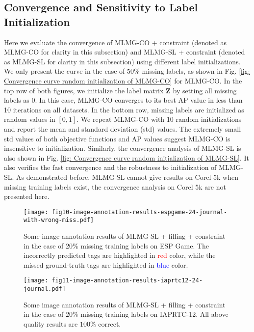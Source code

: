 \documentclass[twocolumn]{svjour3}          %
\def\red#1{\textcolor{red}{#1}}
\def\blue#1{\textcolor{blue}{#1}}
\begin{document}
\subsection{Convergence and Sensitivity to Label Initialization} 
\label{sec: 5 subsec convergence curve}
Here we evaluate the convergence of MLMG-CO + constraint (denoted as MLMG-CO for clarity in this subsection) and MLMG-SL + constraint (denoted as MLMG-SL for clarity in this subsection) using different label initializations. We only present the curve in the case of $50\%$ missing labels, as shown in Fig. \ref{fig: Convergence curve random initialization of MLMG-CO} for MLMG-CO. 
In the top row of both figures, we initialize the label matrix $\mathbf{Z}$ by setting all missing labels as $0$. In this case, MLMG-CO converges to its best AP value in less than 10 iterations on all datasets. 
In the bottom row, missing labels are initialized as random values in $[0,1]$. We repeat MLMG-CO with 10 random initializations and report the mean and standard deviation (std) values. The extremely small std values of both objective functions and AP values suggest MLMG-CO is insensitive to initialization.
Similarly, the convergence analysis of MLMG-SL is also shown in Fig. \ref{fig: Convergence curve random initialization of MLMG-SL}. 
It also verifies the fast convergence and the robustness to initialization of MLMG-SL. 
As demonstrated before, MLMG-SL cannot give results on Corel 5k when missing training labels exist, the convergence analysis on Corel 5k are not presented here. 


\begin{figure}[t]
\centering
\texttt{[image: fig10-image-annotation-results-espgame-24-journal-with-wrong-miss.pdf]}
\vspace{-0.15in}
\caption{Some image annotation results of MLMG-SL + filling + constraint in the case of $20\%$ missing training labels on ESP Game. The incorrectly predicted tags are highlighted in \red{red} color, while the missed ground-truth tags are highlighted in \blue{blue} color.}
\label{fig: quality results of image annotation on espgame}
\end{figure}


\begin{figure}[t]
\centering
\texttt{[image: fig11-image-annotation-results-iaprtc12-24-journal.pdf]}
\vspace{-0.15in}
\caption{Some image annotation results of MLMG-SL + filling + constraint in the case of $20\%$ missing training labels on IAPRTC-12. All above quality results are $100\%$ correct.}
\label{fig: quality results of image annotation on iaprtc12}
\end{figure}
\end{document}
